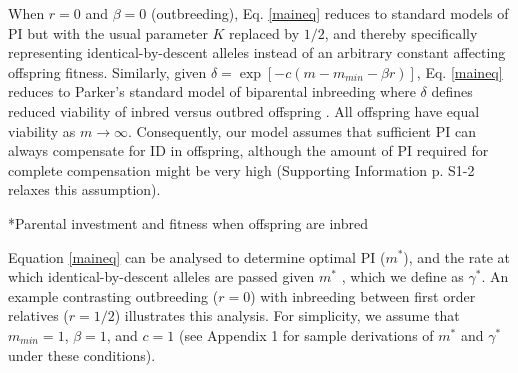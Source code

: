 \documentclass[12pt]{article}
\makeatletter
\renewcommand\subsection{\@startsection{subsection}{1}{-0.25in}{-0.5\baselineskip}{0.1\baselineskip}{\normalfont\normalsize\bfseries\textit}}
\makeatother
\begin{document}
When $r=0$ and $\beta=0$ (outbreeding), Eq. \ref{maineq} reduces to standard models of PI \cite[e.g.,][]{Macnair1978, Parker1978} but with the usual parameter $K$ replaced by $1/2$, and thereby specifically representing identical-by-descent alleles instead of an arbitrary constant affecting offspring fitness. Similarly, given $\delta = \exp\left[-c\left(m-m_{min}-\beta r\right)\right]$, Eq. \ref{maineq} reduces to Parker's \citeyearpar{Parker1979} standard model of biparental inbreeding where $\delta$ defines reduced viability of inbred versus outbred offspring \cite[see][]{Kokko2006, Parker2006, Duthie2015a}.  All offspring have equal viability as $m \to \infty$. Consequently, our model assumes that sufficient PI can always compensate for ID in offspring, although the amount of PI required for complete compensation might be very high (Supporting Information p. S1-2 relaxes this assumption).


\subsection*{Parental investment and fitness when offspring are inbred}

Equation \ref{maineq} can be analysed to determine optimal PI ($m^{*}$), and the rate at which identical-by-descent alleles are passed given $m^{*}$ \cite[][]{Kuijper2012}, which we define as $\gamma^{*}$. An example contrasting outbreeding ($r=0$) with inbreeding between first order relatives ($r=1/2$) illustrates this analysis. For simplicity, we assume that $m_{min}=1$, $\beta=1$, and $c=1$ (see Appendix 1 for sample derivations of $m^{*}$ and $\gamma^{*}$ under these conditions).
\end{document}
